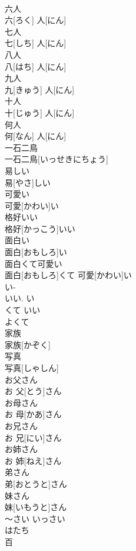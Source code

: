 \documentclass[8pt]{extreport}
\begin{document}
\begin{CJK}{UTF8}{min}
\\	六人	
\\	六[ろく] 人[にん]
\\	七人	
\\	七[しち] 人[にん]
\\	八人	
\\	八[はち] 人[にん]
\\	九人	
\\	九[きゅう] 人[にん]
\\	十人	
\\	十[じゅう] 人[にん]
\\	何人	
\\	何[なん] 人[にん]
\\	一石二鳥	
\\	一石二鳥[いっせきにちょう]
\\	易しい	
\\	易[やさ]しい
\\	可愛い	
\\	可愛[かわい]い
\\	格好いい	
\\	格好[かっこう]いい
\\	面白い	
\\	面白[おもしろ]い
\\	面白くて可愛い	
\\	面白[おもしろ]くて 可愛[かわい]い
\\	い-
\\	いい.	い 
\\	くて いい 
\\	よくて
\\	家族	
\\	家族[かぞく]
\\	写真	
\\	写真[しゃしん]
\\	お父さん	
\\	お 父[とう]さん
\\	お母さん	
\\	お 母[かあ]さん
\\	お兄さん	
\\	お 兄[にい]さん
\\	お姉さん	
\\	お 姉[ねえ]さん
\\	弟さん	
\\	弟[おとうと]さん
\\	妹さん	
\\	妹[いもうと]さん
\\	～さい いっさい 
\\	はたち 
\\	百	

\end{CJK}
\end{document}
